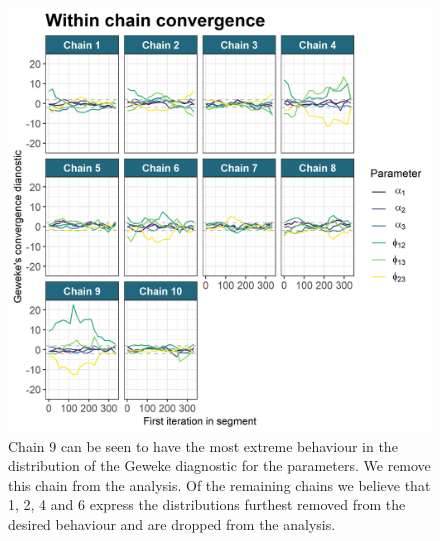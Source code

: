 \documentclass[]{article}
\begin{document}
\begin{figure}
	\centering
	\includegraphics[scale=1.0]{./Images/Yeast/Convergence/gewekePlot.png}
	\caption{Chain 9 can be seen to have the most extreme behaviour in the distribution of the Geweke diagnostic for the parameters. We remove this chain from the analysis. Of the remaining chains we believe that 1, 2, 4 and 6 express the distributions furthest removed from the desired behaviour and are dropped from the analysis.}
	\label{fig:gewekePlot}
\end{figure}
\end{document}
